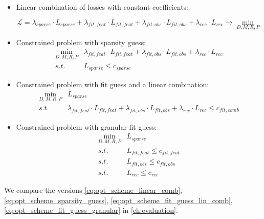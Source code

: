 \documentclass[a4paper,11pt,oneside]{report}
\begin{document}
\begin{itemize}
    \item Linear combination of losses with constant coefficients:

    \begin{equation}
    \label{eq:opt_scheme_linear_comb}
    \mathcal L=\lambda_{sparse}\cdot L_{sparse}+\lambda_{fit,feat}\cdot L_{fit, feat}+\lambda_{fit,obs}\cdot L_{fit, obs}+\lambda_{rec}\cdot L_{rec}\to\min\limits_{D,M,R,P}
    \end{equation}

    \item Constrained problem with sparsity guess:
    \begin{equation}
    \label{eq:opt_scheme_sparsity_guess}
    \begin{array}{ll}
    \min\limits_{D,M,R,P}& \lambda_{fit,feat}\cdot L_{fit, feat}+\lambda_{fit,obs}\cdot L_{fit, obs}+\lambda_{rec}\cdot L_{rec}\\
    s.t.& L_{sparse}\leq c_{sparse}
    \end{array}
    \end{equation}

    \item Constrained problem with fit guess and a linear combination:
    \begin{equation}
    \label{eq:opt_scheme_fit_guess_lin_comb}
    \begin{array}{ll}
    \min\limits_{D,M,R,P}& L_{sparse}\\
    s.t.&\lambda_{fit,feat}\cdot L_{fit, feat}+\lambda_{fit,obs}\cdot L_{fit, obs}+\lambda_{rec}\cdot L_{rec} \leq c_{fit, comb}
    \end{array}
    \end{equation}

    \item Constrained problem with granular fit guess:
    \begin{equation}
    \label{eq:opt_scheme_fit_guess_granular}
    \begin{array}{ll}
    \min\limits_{D,M,R,P}& L_{sparse}\\
    s.t.&L_{fit, feat}\leq c_{fit, feat}\\
    s.t.&L_{fit, obs}\leq c_{fit, obs}\\
    s.t.&L_{rec}\leq c_{rec}
    \end{array}
    \end{equation}
\end{itemize}

We compare the versions \ref{eq:opt_scheme_linear_comb}, \ref{eq:opt_scheme_sparsity_guess}, \ref{eq:opt_scheme_fit_guess_lin_comb}, \ref{eq:opt_scheme_fit_guess_granular} in \autoref{ch:evaluation}.
\end{document}
